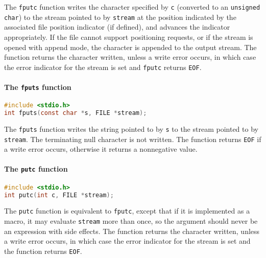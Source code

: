 The \texttt{fputc} function writes the character specified by \texttt{c}
(converted to an \texttt{unsigned char}) to the stream pointed to by
\texttt{stream} at the position indicated by the associated file position
indicator (if defined), and advances the indicator appropriately. If the file
cannot support positioning requests, or if the stream is opened with append
mode, the character is appended to the output stream. The function returns the
character written, unless a write error occurs, in which case the error
indicator for the stream is set and \texttt{fputc} returns \texttt{EOF}.

\paragraph{The \texttt{fputs} function}
\lstset{basicstyle=\scriptsize, numbers=left, captionpos=b, tabsize=4}
\begin{lstlisting}[caption=Section \thesection listing \arabic{filecnt},language={C},
breaklines=true,xleftmargin=15pt,label=lst:section\thesection listing\arabic{filecnt}]
#include <stdio.h>
int fputs(const char *s, FILE *stream);
\end{lstlisting}

The \texttt{fputs} function writes the string pointed to by \texttt{s} to the
stream pointed to by \texttt{stream}. The terminating null character is not
written. The function returns \texttt{EOF} if a write error occurs, otherwise
it returns a nonnegative value.

\paragraph{The \texttt{putc} function}
\lstset{basicstyle=\scriptsize, numbers=left, captionpos=b, tabsize=4}
\begin{lstlisting}[caption=Section \thesection listing \arabic{filecnt},language={C},
breaklines=true,xleftmargin=15pt,label=lst:section\thesection listing\arabic{filecnt}]
#include <stdio.h>
int putc(int c, FILE *stream);
\end{lstlisting}

The \texttt{putc} function is equivalent to \texttt{fputc}, except that if it
is implemented as a macro, it may evaluate \texttt{stream} more than once, so
the argument should never be an expression with side effects. The function
returns the character written, unless a write error occurs, in which case the
error indicator for the stream is set and the function returns \texttt{EOF}.

